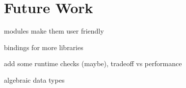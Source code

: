 
\section{Future Work}

modules make them user friendly


bindings for more libraries

add some runtime checks (maybe), tradeoff vs performance

algebraic data types



